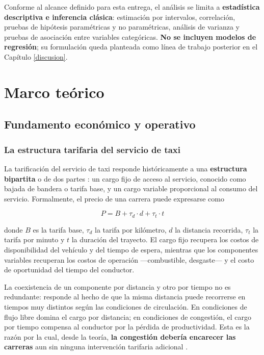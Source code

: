 \documentclass[
]{book}
\begin{document}
Conforme al alcance definido para esta entrega, el análisis se limita a \textbf{estadística
descriptiva e inferencia clásica}: estimación por intervalos, correlación, pruebas de
hipótesis paramétricas y no paramétricas, análisis de varianza y pruebas de asociación entre
variables categóricas. \textbf{No se incluyen modelos de regresión}; su formulación queda planteada
como línea de trabajo posterior en el Capítulo \ref{discusion}.

\chapter{Marco teórico}\label{marco}

\section{Fundamento económico y operativo}\label{fundamento-econuxf3mico-y-operativo}

\subsection{La estructura tarifaria del servicio de taxi}\label{la-estructura-tarifaria-del-servicio-de-taxi}

La tarificación del servicio de taxi responde históricamente a una \textbf{estructura bipartita}
o de dos partes \citep{oi1971}: un cargo fijo de acceso al servicio, conocido como bajada de
bandera o tarifa base, y un cargo variable proporcional al consumo del servicio. Formalmente,
el precio de una carrera puede expresarse como

\[P = B + \tau_d \cdot d + \tau_t \cdot t\]

donde \(B\) es la tarifa base, \(\tau_d\) la tarifa por kilómetro, \(d\) la distancia recorrida,
\(\tau_t\) la tarifa por minuto y \(t\) la duración del trayecto. El cargo fijo recupera los
costos de disponibilidad del vehículo y del tiempo de espera, mientras que los componentes
variables recuperan los costos de operación ---combustible, desgaste--- y el costo de oportunidad
del tiempo del conductor.

La coexistencia de un componente por distancia y otro por tiempo no es redundante: responde
al hecho de que la misma distancia puede recorrerse en tiempos muy distintos según las
condiciones de circulación. En condiciones de flujo libre domina el cargo por distancia; en
condiciones de congestión, el cargo por tiempo compensa al conductor por la pérdida de
productividad. Esta es la razón por la cual, desde la teoría, \textbf{la congestión debería
encarecer las carreras} aun sin ninguna intervención tarifaria adicional \citep{small2007}.
\end{document}
